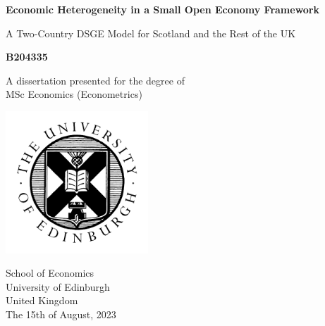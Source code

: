 \begin{titlepage}
    \begin{center}
        \vspace*{1cm}
        \LARGE
        \textbf{Economic Heterogeneity in a Small Open Economy Framework}
 
        \vspace{0.5cm}
        A Two-Country DSGE Model for Scotland and the Rest of the UK
             
        \vspace{1.5cm}
 
        \textbf{B204335}
 
        \vfill
             
        A dissertation presented for the degree of\\
        MSc Economics (Econometrics) 
             
        \vspace{0.8cm}
      
        \includegraphics[width=0.4\textwidth]{./Title Page/uoe_logo.png}
             
        School of Economics\\
        University of Edinburgh\\
        United Kingdom\\
        The 15th of August, 2023
             
    \end{center}
 \end{titlepage}